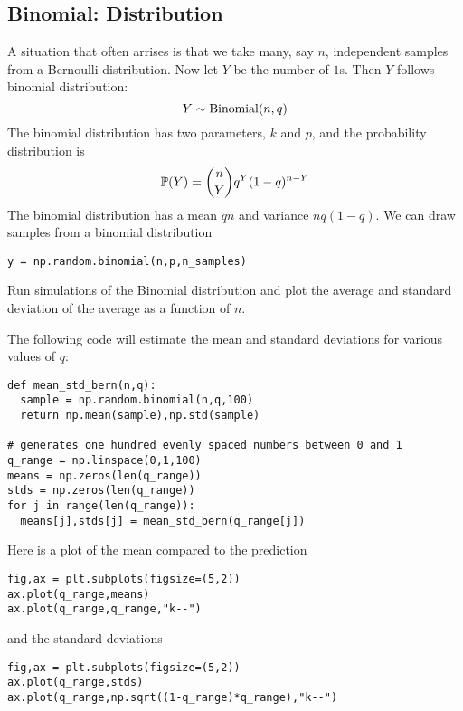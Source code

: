  \subsection{Binomial: Distribution}
A situation that often arrises is that we take many, say $n$, independent samples from a Bernoulli distribution. Now let $Y$ be the number of $1$s. Then $Y$ follows {\dfn binomial distribution}: 
\begin{equation}
Y \sim {\rm Binomial}(n,q)
\end{equation}
The binomial distribution has two parameters, $k$ and $p$, and the probability distribution is 
\begin{equation}
\mathbb P(Y) = {n \choose Y}q^{Y}(1-q)^{n-Y}
\end{equation}
The binomial distribution has a mean $qn$ and variance $nq(1-q)$. 
We can draw samples from a binomial distribution 
 \begin{Verbatim}
y = np.random.binomial(n,p,n_samples)
 \end{Verbatim}
 
 

\begin{exercise}
Run simulations of the Binomial distribution and plot the average and standard deviation of the average as a function of $n$. 
\end{exercise}
\begin{solution}
The following code will estimate the mean and standard deviations for various values of $q$: 
\begin{Verbatim}
def mean_std_bern(n,q):
  sample = np.random.binomial(n,q,100)
  return np.mean(sample),np.std(sample)

# generates one hundred evenly spaced numbers between 0 and 1
q_range = np.linspace(0,1,100) 
means = np.zeros(len(q_range))
stds = np.zeros(len(q_range))
for j in range(len(q_range)):
  means[j],stds[j] = mean_std_bern(q_range[j])
\end{Verbatim}
Here is a plot of the mean compared to the prediction 
\begin{Verbatim}
fig,ax = plt.subplots(figsize=(5,2))
ax.plot(q_range,means)
ax.plot(q_range,q_range,"k--")
\end{Verbatim}
and the standard deviations
\begin{Verbatim}
fig,ax = plt.subplots(figsize=(5,2))
ax.plot(q_range,stds)
ax.plot(q_range,np.sqrt((1-q_range)*q_range),"k--")
\end{Verbatim}
\end{solution}


